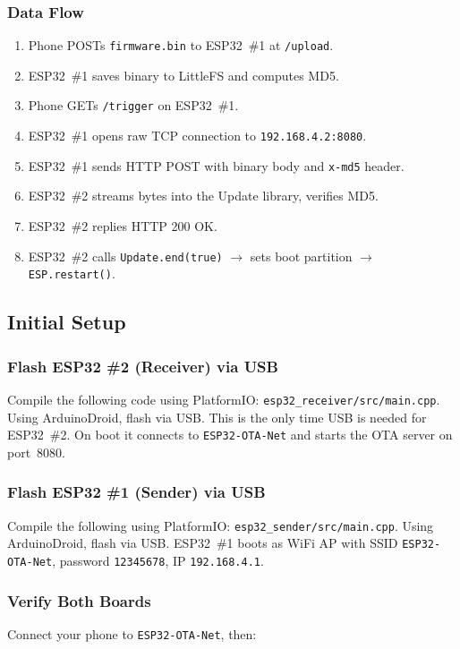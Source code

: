 \documentclass[conference]{IEEEtran}
\begin{document}
\subsubsection{Data Flow}
\begin{enumerate}
\item Phone POSTs \texttt{firmware.bin} to ESP32~\#1 at \texttt{/upload}.
\item ESP32~\#1 saves binary to LittleFS and computes MD5.
\item Phone GETs \texttt{/trigger} on ESP32~\#1.
\item ESP32~\#1 opens raw TCP connection to \texttt{192.168.4.2:8080}.
\item ESP32~\#1 sends HTTP POST with binary body and \texttt{x-md5} header.
\item ESP32~\#2 streams bytes into the Update library, verifies MD5.
\item ESP32~\#2 replies HTTP 200 OK.
\item ESP32~\#2 calls \texttt{Update.end(true)} $\rightarrow$ sets boot
      partition $\rightarrow$ \texttt{ESP.restart()}.
\end{enumerate}

\subsection{Initial Setup}

\subsubsection{Flash ESP32 \#2 (Receiver) via USB}
Compile the following code using PlatformIO:
\texttt{esp32\_receiver/src/main.cpp}.
Using ArduinoDroid, flash via USB.
This is the only time USB is needed for ESP32~\#2.
On boot it connects to \texttt{ESP32-OTA-Net} and starts the OTA server on
port~8080.

\subsubsection{Flash ESP32 \#1 (Sender) via USB}
Compile the following using PlatformIO:
\texttt{esp32\_sender/src/main.cpp}.
Using ArduinoDroid, flash via USB.
ESP32~\#1 boots as WiFi AP with SSID \texttt{ESP32-OTA-Net},
password \texttt{12345678}, IP \texttt{192.168.4.1}.

\subsubsection{Verify Both Boards}
Connect your phone to \texttt{ESP32-OTA-Net}, then:
\end{document}
